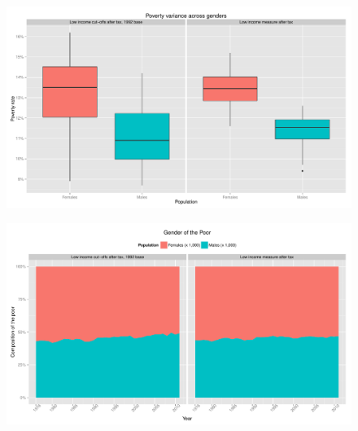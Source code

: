 \documentclass{article}\usepackage[]{graphicx}\usepackage[]{color}
\makeatletter
\def\maxwidth{ %
  \ifdim\Gin@nat@width>\linewidth
    \linewidth
  \else
    \Gin@nat@width
  \fi
}
\newenvironment{knitrout}{}{} %
\makeatother
\begin{document}
\begin{figure}[ht]
\begin{center}
\begin{knitrout}
\color{fgcolor}
\includegraphics[width=\maxwidth]{figure/unnamed-chunk-10} 

\end{knitrout}

\end{center}
\end{figure}
\begin{figure}[ht]
\begin{center}
\begin{knitrout}
\color{fgcolor}
\includegraphics[width=\maxwidth]{figure/unnamed-chunk-11} 

\end{knitrout}

\end{center}
\end{figure}
\clearpage
\end{document}
